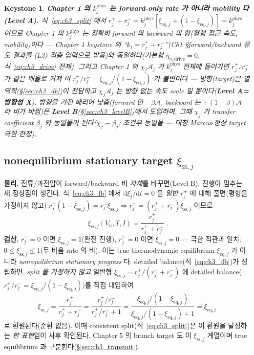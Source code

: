 \documentclass[11pt,a4paper]{article}
\newtheorem*{keybox}{Keystone}
\newcommand{\dd}{\mathrm{d}}
\newcommand{\eq}{\mathrm{eq}}
\newcommand{\drive}{\mathrm{drive}}
\newcommand{\sstat}{\mathrm{ss}}
\begin{document}
\begin{keybox}
\textbf{Chapter 1 의 $k_j^{\mathrm{phys}}$ 는 forward-only rate 가 아니라 mobility 다 (Level A).} 식~\eqref{eq:ch3_split}
에서 $r_j^++r_j^-=k_j^{\mathrm{phys}}[\xi_{\eq,j}+(1-\xi_{\eq,j})]=k_j^{\mathrm{phys}}$ 이므로 Chapter 1 의
$k_j^{\mathrm{phys}}$ 는 정확히 \emph{forward 와 backward 의 합}(평형 접근 속도, mobility)이다 — Chapter 1
keystone 의 ``$k_j=r_j^++r_j^-$''(Ch1 §forward/backward 유도 결과를 (L2) 적층 입력으로 받음)와 동일하다(기본형
$\eta_{n,\drive}=0$, 식~\eqref{eq:ch3_drive} 전제). 그리고 Chapter 1 의 $\chi_j\mathcal A_j$
가 $k_j^{\mathrm{phys}}$ \emph{전체}에 들어가면 $r_j^+,r_j^-$ 가 \emph{같은 배율}로 커져 비
$r_j^+/r_j^-=\xi_{\eq,j}/(1-\xi_{\eq,j})$ 가 \emph{불변}이다 — 방향(target)은 열역학(\S\ref{sec:ch3_db})이
전담하고 $\chi_j\mathcal A_j$ 는 \emph{방향 없는} 속도 scale 일 뿐이다(\textbf{Level A=방향성 X}). \emph{방향을
가진} 배리어 낮춤(forward 만 $-\beta\mathcal A$, backward 는 $+(1-\beta)\mathcal A$ 라 비가 바뀜)은
\textbf{Level B}(\S\ref{sec:ch3_levelB})에서 도입하며, 그때 $\chi_j$ 가 transfer coefficient $\beta_j$ 와
\emph{동일물}이 된다($\chi_j\equiv\beta_j$; 조건부 동일물 — 대칭 Marcus$\cdot$정상 target 극한 한정).
\end{keybox}

\subsection{nonequilibrium stationary target $\xi_{\sstat,j}$}\label{sec:ch3_xiss}
\textbf{물리.} 전류/과전압이 forward/backward 비 \emph{자체}를 바꾸면(Level B), 진행이 멈추는 새 정상점이
생긴다. 식~\eqref{eq:ch3_fb} 에서 $\dd\xi_j/\dd t=0$ 을 \emph{일반} $r_j^\pm$ 에 대해 풀면(평형을 가정하지 않고)
$r_j^+(1-\xi_{\sstat,j})=r_j^-\xi_{\sstat,j}\Rightarrow r_j^+=(r_j^++r_j^-)\xi_{\sstat,j}$ 이므로
\begin{equation}
\boxed{\;\xi_{\sstat,j}(V_n,T,I)=\frac{r_j^+}{r_j^++r_j^-}\;.}
\label{eq:ch3_xiss}
\end{equation}
\textbf{검산.} $r_j^-=0$ 이면 $\xi_{\sstat,j}=1$(완전 진행), $r_j^+=0$ 이면 $\xi_{\sstat,j}=0$ — 극한 직관과 일치;
$0\le\xi_{\sstat,j}\le1$(두 비음 rate 의 비). 이는 true thermodynamic equilibrium $\xi_{\eq,j}$ 가 아니라
\emph{nonequilibrium stationary progress} 다. detailed balance(식~\eqref{eq:ch3_db})가 성립하면, \emph{split 을
가정하지 않고} 일반형 $\xi_{\sstat,j}=r_j^+/(r_j^++r_j^-)$ 에 detailed balance($r_j^+/r_j^-=\xi_{\eq,j}/(1-\xi_{\eq,j})$)를
직접 대입하여
\begin{equation*}
\xi_{\sstat,j}=\frac{r_j^+}{r_j^++r_j^-}=\frac{r_j^+/r_j^-}{r_j^+/r_j^-+1}
=\frac{\xi_{\eq,j}/(1-\xi_{\eq,j})}{\xi_{\eq,j}/(1-\xi_{\eq,j})+1}=\xi_{\eq,j}
\end{equation*}
로 환원된다(순환 없음). 이때 consistent split(식~\eqref{eq:ch3_split})은 이 환원을 달성하는 \emph{한 표현}임이
사후 확인된다. Chapter 5
의 branch target 도 이 $\xi_{\sstat,j}$ 계열이며 true equilibrium 과 구분한다(\S\ref{sec:ch3_transmit}).
\end{document}
